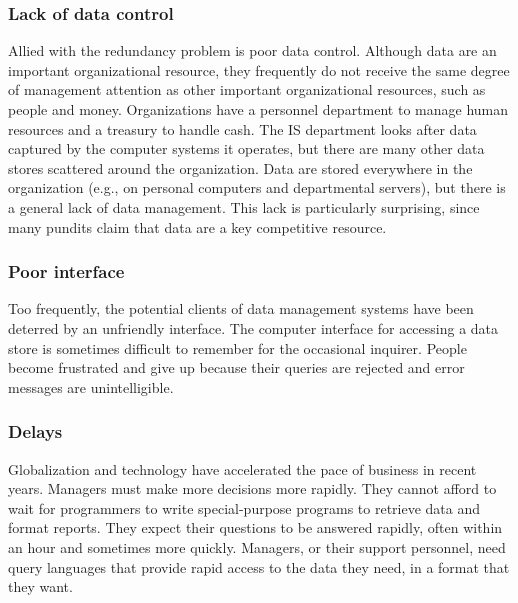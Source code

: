 \documentclass[
]{article}
\begin{document}
\hypertarget{lack-of-data-control}{%
\subsubsection*{Lack of data control}\label{lack-of-data-control}}

Allied with the redundancy problem is poor data control. Although data
are an important organizational resource, they frequently do not receive
the same degree of management attention as other important
organizational resources, such as people and money. Organizations have a
personnel department to manage human resources and a treasury to handle
cash. The IS department looks after data captured by the computer
systems it operates, but there are many other data stores scattered
around the organization. Data are stored everywhere in the organization
(e.g., on personal computers and departmental servers), but there is a
general lack of data management. This lack is particularly surprising,
since many pundits claim that data are a key competitive resource.

\hypertarget{poor-interface}{%
\subsubsection*{Poor interface}\label{poor-interface}}

Too frequently, the potential clients of data management systems have
been deterred by an unfriendly interface. The computer interface for
accessing a data store is sometimes difficult to remember for the
occasional inquirer. People become frustrated and give up because their
queries are rejected and error messages are unintelligible.

\hypertarget{delays}{%
\subsubsection*{Delays}\label{delays}}

Globalization and technology have accelerated the pace of business in
recent years. Managers must make more decisions more rapidly. They
cannot afford to wait for programmers to write special-purpose programs
to retrieve data and format reports. They expect their questions to be
answered rapidly, often within an hour and sometimes more quickly.
Managers, or their support personnel, need query languages that provide
rapid access to the data they need, in a format that they want.
\end{document}
